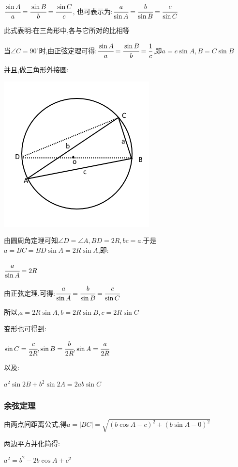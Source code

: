 \documentclass[UTF8,12pt]{ctexbook}
\newcommand{\degree}{^\circ}
\begin{document}
{{{$\cfrac{\sin A}{a} = \cfrac{\sin B}{b} = \cfrac{\sin C}{c}$, 也可表示为:$\cfrac{a}{\sin A} = \cfrac{b}{\sin B} = \cfrac{c}{\sin C}$

此式表明:在三角形中,各{}与它所对{}的比相等

当$\angle C = 90\degree$时,由正弦定理可得:$\cfrac{\sin A}{a} = \cfrac{\sin B}{b} = \cfrac{1}{c}$,即$a = c\sin A,B = C\sin B$

并且,做三角形外接圆:

\begin{center}
  \includegraphics[scale=0.5]{resources/insideTriangleAndCircleOutSide.png}
\end{center}

由圆周角定理可知$\angle D = \angle A,BD = 2R,bc = a$.于是$a = BC = BD\sin A = 2R\sin A$,即:

$\cfrac{a}{\sin A} = 2R$

由正弦定理,可得:$\cfrac{a}{\sin A} = \cfrac{b}{\sin B} = \cfrac{c}{\sin C}$

所以,$a = 2R\sin A,b = 2R\sin B,c = 2R\sin C$

变形也可得到:

$\sin C = \cfrac{c}{2R},\sin B = \cfrac{b}{2R},\sin A = \cfrac{a}{2R}$

以及:

$a^2\sin2B + b^2\sin2A = 2ab\sin C$
}%

\subsubsection{余弦定理}{
  由两点间距离公式,得$a = |BC| = \sqrt{(b\cos A - c)^2 + (b\sin A - 0)^2}$

  两边平方并化简得:

  $a^2 = b^2 - 2b\cos A + c^2$

}}}
\end{document}
